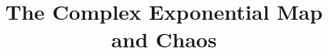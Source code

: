 \documentclass[mat1]{fmfdelo}
\title{The Complex Exponential Map and Chaos}
\begin{document}
\graphicspath{ {./slike/} }









\end{document}
